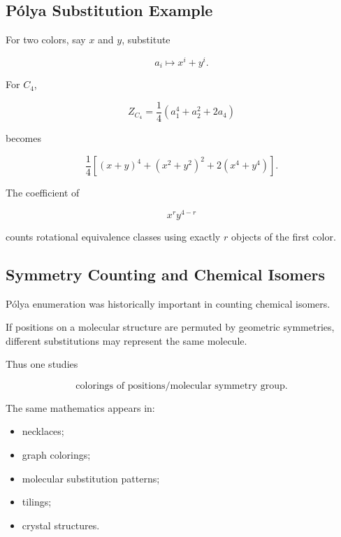 \subsection{P\'olya Substitution Example}
\label{subsec:polya-substitution-example}

For two colors, say \(x\) and \(y\), substitute

\[
a_i
\longmapsto
x^i+y^i.
\]

For \(C_4\),

\[
Z_{C_4}
=
\frac14
\left(
a_1^4+a_2^2+2a_4
\right)
\]

becomes

\[
\boxed{
\frac14
\left[
(x+y)^4
+
(x^2+y^2)^2
+
2(x^4+y^4)
\right].
}
\]

The coefficient of

\[
x^ry^{4-r}
\]

counts rotational equivalence classes using exactly \(r\) objects of the
first color.

\subsection{Symmetry Counting and Chemical Isomers}
\label{subsec:symmetry-chemical-isomers}

P\'olya enumeration was historically important in counting chemical
isomers.

If positions on a molecular structure are permuted by geometric
symmetries, different substitutions may represent the same molecule.

Thus one studies

\[
\boxed{
\text{colorings of positions}
\big/
\text{molecular symmetry group}.
}
\]

The same mathematics appears in:

\begin{itemize}
    \item necklaces;
    \item graph colorings;
    \item molecular substitution patterns;
    \item tilings;
    \item crystal structures.
\end{itemize}

